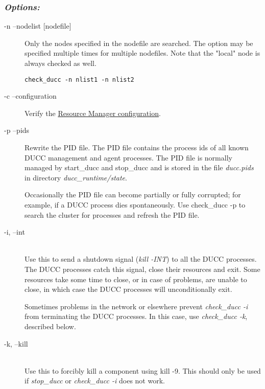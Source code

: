      \subsubsection{\em{Options:}}
         \begin{description}
           \item[-n --nodelist {[nodefile]}]
             Only the nodes specified in the nodefile are searched. The option may be specified 
             multiple times for multiple nodefiles. Note that the "local" node is always checked as well. 
\begin{verbatim}
check_ducc -n nlist1 -n nlist2 
\end{verbatim}
                       
           \item[-c --configuration]
             Verify the \hyperref[sec:ducc.classes]{Resource Manager configuration}.

           \item[-p --pids]               
               Rewrite the PID file. The PID file contains the process ids of all known DUCC 
               management and agent processes. The PID file is normally managed by start\_ducc and 
               stop\_ducc and is stored in the file {\em ducc.pids} in directory {\em ducc\_runtime/state}.
               
               Occasionally the PID file can become partially or fully corrupted; for example, if a DUCC 
               process dies spontaneously. Use check\_ducc -p to search the cluster for processes and 
               refresh the PID file. 
               
            \item[-i, --int] \hfill \\
              Use this to send a shutdown signal ({\em kill -INT}) to all the DUCC processes.  The DUCC processes
              catch this signal, close their resources and exit.  Some resources take some time to close, or in
              case of problems, are unable to close, in which case the DUCC processes will unconditionally exit.

              Sometimes problems in the network or elsewhere prevent {\em check\_ducc -i} from terminating
              the DUCC processes.  In this case, use {\em check\_ducc -k}, described below.

            \item[-k, --kill] \hfill \\
              Use this to forcibly kill a component using kill -9. This should only be used if {\em stop\_ducc}
              or {\em check\_ducc -i} does not work.  


\end{description}
